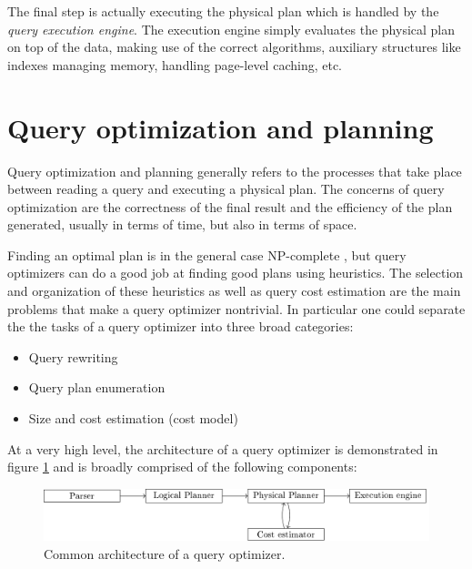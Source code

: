 The final step is actually executing the physical plan which is
handled by the \emph{query execution engine}. The execution engine
simply evaluates the physical plan on top of the data, making use of
the correct algorithms, auxiliary structures like indexes managing
memory, handling page-level caching, etc.

\section{Query optimization and planning}

Query optimization and planning generally refers to the processes that
take place between reading a query and executing a physical plan. The
concerns of query optimization are the correctness of the final result and
the efficiency of the plan generated, usually in terms of time, but
also in terms of space.

Finding an optimal plan is in the general case NP-complete
\cite{ullmanInformationIntegrationUsing1997}, but query optimizers can
do a good job at finding good plans using heuristics. The selection
and organization of these heuristics as well as query cost estimation
are the main problems that make a query optimizer nontrivial. In
particular one could separate the the tasks of a query optimizer
into three broad categories:

\begin{itemize}
\item Query rewriting
\item Query plan enumeration
\item Size and cost estimation (cost model)
\end{itemize}


At a very high level, the architecture of a query optimizer is
demonstrated in figure \ref{fig:optimizer_arch} and is broadly
comprised of the following components:

\begin{figure}[p]
\centering
\includegraphics[width=\textwidth]{./imgs/optimizer_architecture.pdf}
\caption{\label{fig:optimizer_arch}Common architecture of a query
  optimizer.}
\end{figure}

